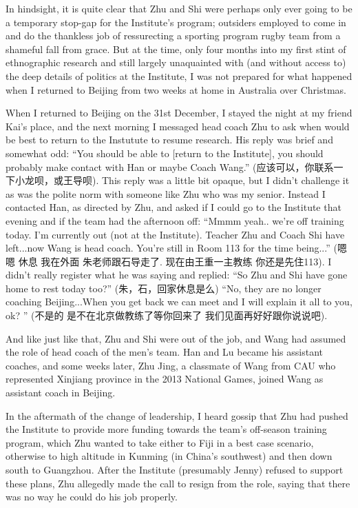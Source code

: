 In hindsight, it is quite clear that Zhu and Shi were perhaps only ever going to be a temporary stop-gap for the Institute's program; outsiders employed to come in and do the thankless job of ressurecting a sporting program rugby team from a shameful fall from grace.  But at the time, only four months into my first stint of ethnographic research and still largely unaquainted with (and without access to) the deep details of politics at the Institute, I was not prepared for what happened when I returned to Beijing from two weeks at home in Australia over Christmas.

When I returned to Beijing on the 31st December, I stayed the night at my friend Kai's place, and the next morning I messaged head coach Zhu to ask when would be best to return to the Instutute to resume research.  His reply was brief and somewhat odd: ``You should be able to [return to the Institute], you should probably make contact with Han or maybe Coach Wang.'' (应该可以，你联系一下小龙呗，或王导呗).  This reply was a little bit opaque, but I didn't challenge it as was the polite norm with someone like Zhu who was my senior.  Instead I contacted Han, as directed by Zhu, and asked if I could go to the Institute that evening and if the team had the afternoon off: ``Mmmm yeah.. we're off training today. I'm currently out (not at the Institute). Teacher Zhu and Coach Shi have left...now Wang is head coach.  You're still in Room 113 for the time being...'' (嗯嗯 休息 我在外面 朱老师跟石导走了. 现在由王重一主教练 你还是先住113).  I didn't really register what he was saying and replied:
``So Zhu and Shi have gone home to rest today too?'' (朱，石，回家休息是么)
``No, they are no longer coaching Beijing...When you get back we can meet and I will explain it all to you, ok? '' (不是的 是不在北京做教练了等你回来了 我们见面再好好跟你说说吧).

And like just like that, Zhu and Shi were out of the job, and Wang had assumed the role of head coach of the men's team.  Han and Lu became his assistant coaches, and some weeks later, Zhu Jing, a classmate of Wang from CAU who represented Xinjiang province in the 2013 National Games, joined Wang as assistant coach in Beijing.

In the aftermath of the change of leadership, I heard gossip that Zhu had pushed the Institute to provide more funding towards the team's off-season training program, which Zhu wanted to take either to Fiji in a best case scenario, otherwise to high altitude in Kunming (in China's southwest) and then down south to Guangzhou. After the Institute (presumably Jenny) refused to support these plans, Zhu allegedly made the call to resign from the role, saying that there was no way he could do his job properly.

